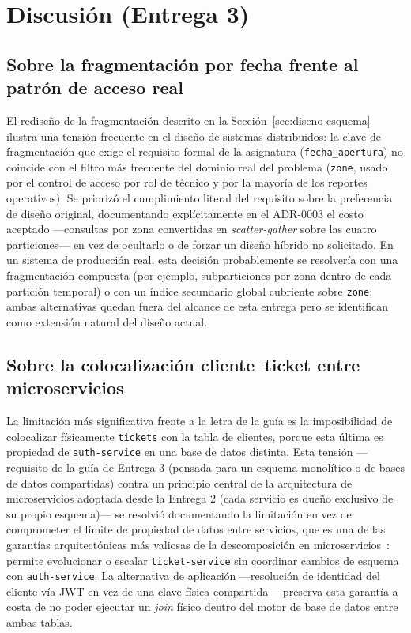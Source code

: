 \section{Discusión (Entrega 3)}
\label{sec:discusion}

\subsection{Sobre la fragmentación por fecha frente al patrón de acceso real}

El rediseño de la fragmentación descrito en la Sección~\ref{sec:diseno-esquema} ilustra una tensión
frecuente en el diseño de sistemas distribuidos: la clave de fragmentación que exige el requisito
formal de la asignatura (\texttt{fecha\_apertura}) no coincide con el filtro más frecuente del
dominio real del problema (\texttt{zone}, usado por el control de acceso por rol de técnico y por
la mayoría de los reportes operativos). Se priorizó el cumplimiento literal del requisito sobre la
preferencia de diseño original, documentando explícitamente en el ADR-0003 el costo aceptado
—consultas por zona convertidas en \emph{scatter-gather} sobre las cuatro particiones— en vez de
ocultarlo o de forzar un diseño híbrido no solicitado. En un sistema de producción real, esta
decisión probablemente se resolvería con una fragmentación compuesta (por ejemplo, subparticiones
por zona dentro de cada partición temporal) o con un índice secundario global cubriente sobre
\texttt{zone}; ambas alternativas quedan fuera del alcance de esta entrega pero se identifican como
extensión natural del diseño actual.

\subsection{Sobre la colocalización cliente–ticket entre microservicios}

La limitación más significativa frente a la letra de la guía es la imposibilidad de colocalizar
físicamente \texttt{tickets} con la tabla de clientes, porque esta última es propiedad de
\texttt{auth-service} en una base de datos distinta. Esta tensión —requisito de la guía de
Entrega 3 (pensada para un esquema monolítico o de bases de datos compartidas) contra un principio
central de la arquitectura de microservicios adoptada desde la Entrega 2 (cada servicio es dueño
exclusivo de su propio esquema)— se resolvió documentando la limitación en vez de comprometer el
límite de propiedad de datos entre servicios, que es una de las garantías arquitectónicas más
valiosas de la descomposición en microservicios~\cite{newman2021microservices}: permite evolucionar
o escalar \texttt{ticket-service} sin coordinar cambios de esquema con \texttt{auth-service}. La
alternativa de aplicación —resolución de identidad del cliente vía JWT en vez de una clave física
compartida— preserva esta garantía a costa de no poder ejecutar un \emph{join} físico dentro del
motor de base de datos entre ambas tablas.

